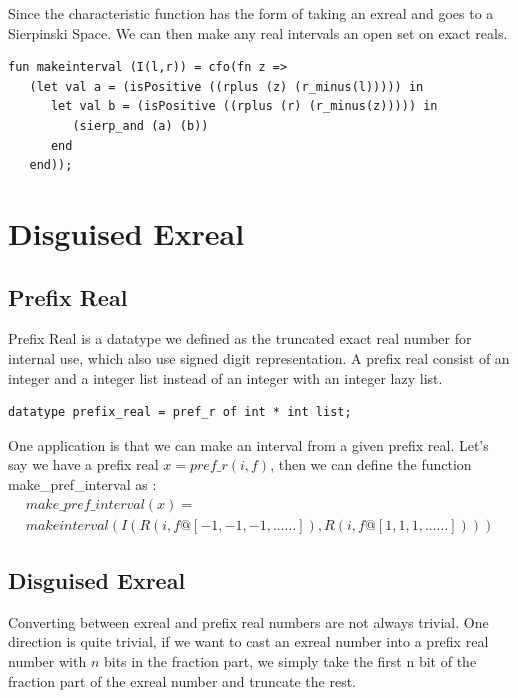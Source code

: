 \documentclass[12pt,twoside,notitlepage]{report}
\begin{document}
Since the characteristic function has the form of taking an exreal and goes to a Sierpinski Space. We can then make any real intervals an open set on exact reals.

{
\begin{verbatim}
fun makeinterval (I(l,r)) = cfo(fn z => 
   (let val a = (isPositive ((rplus (z) (r_minus(l))))) in
      let val b = (isPositive ((rplus (r) (r_minus(z))))) in
         (sierp_and (a) (b))
      end
   end));
\end{verbatim}
}


\section {Disguised Exreal}

\subsection{Prefix Real}
Prefix Real is a datatype we defined as the truncated exact real number for internal use, which also use signed digit representation. A prefix real consist of an integer and a integer list instead of an integer with an integer lazy list.\\

{
\begin{verbatim}
datatype prefix_real = pref_r of int * int list;
\end{verbatim}
}

One application is that we can make an interval from a given prefix real. Let's say we have a prefix real $x = pref\_r(i,f)$, then we can define the function make\_pref\_interval as :
\begin{equation}
\begin{split}
make\_pref\_interval(x) = \\
makeinterval (I(R(i,f@[-1,-1,-1,......]),R(i,f@[1,1,1,......])))
\end{split}
\end{equation}

\subsection{Disguised Exreal}
Converting between exreal and prefix real numbers are not always trivial. One direction is quite trivial, if we want to cast an exreal number into a prefix real number with $n$ bits in the fraction part, we simply take the first n bit of the fraction part of the exreal number and truncate the rest.
\end{document}
